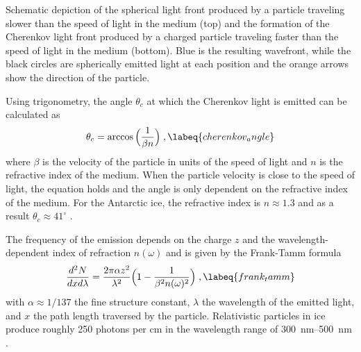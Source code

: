 \begin{marginfigure}
    \caption[Cherenkov light front]{Schematic depiction of the spherical light front produced by a particle traveling slower than the speed of light in the medium (top) and the formation of the Cherenkov light front produced by a charged particle traveling faster than the speed of light in the medium (bottom). Blue is the resulting wavefront, while the black circles are spherically emitted light at each position and the orange arrows show the direction of the particle.}
\end{marginfigure}

Using trigonometry, the angle $\theta_c$ at which the Cherenkov light is emitted can be calculated as
\begin{equation}
    \theta_c = \arccos\Big(\frac{1}{\beta n}\Big)
    \;,
    \labeq{cherenkov_angle}
\end{equation}
where $\beta$ is the velocity of the particle in units of the speed of light and $n$ is the refractive index of the medium. When the particle velocity is close to the speed of light, the equation holds and the angle is only dependent on the refractive index of the medium. For the Antarctic ice, the refractive index is $n \approx 1.3$ and as a result $\theta_c \approx 41^\circ$ .

The frequency of the emission depends on the charge $z$ and the wavelength-dependent index of refraction $n(\omega)$ and is given by the Frank-Tamm formula 
\begin{equation}
    \frac{d^2N}{dxd\lambda} = \frac{2\pi\alpha z^2}{\lambda^2} \Big(1 - \frac{1}{\beta^2n(\omega)^2}\Big)
    \;,
    \labeq{frank_tamm}
\end{equation}
with $\alpha\approx1/137$ the fine structure constant, $\lambda$ the wavelength of the emitted light, and $x$ the path length traversed by the particle. Relativistic particles in ice produce roughly 250 photons per cm in the wavelength range of \SIrange[range-phrase=-]{300}{500}{\nano\metre} .


